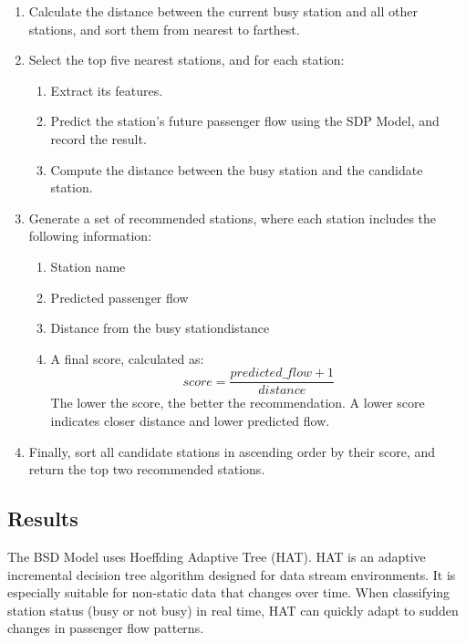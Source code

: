 \documentclass[11pt]{article} %
\begin{document}
\begin{enumerate}
	\item Calculate the distance between the current busy station and all other stations, and sort them from nearest to farthest.
	\item Select the top five nearest stations, and for each station:
	
		\begin{enumerate}
			\item Extract its features.
			\item Predict the station's future passenger flow using the SDP Model, and record the result.
			\item Compute the distance between the busy station and the candidate station.
		\end{enumerate}
		
	\item Generate a set of recommended stations, where each station includes the following information:
	
	\begin{enumerate}
		\item Station name
		\item Predicted passenger flow
		\item Distance from the busy stationdistance
		\item A final score, calculated as:
		\begin{equation}
			score = \frac{predicted\_flow + 1}{distance}
		\end{equation}
		The lower the score, the better the recommendation. A lower score indicates closer distance and lower predicted flow.
	\end{enumerate}
	
	\item Finally, sort all candidate stations in ascending order by their score, and return the top two recommended stations.
\end{enumerate}

\subsection{Results}
The BSD Model uses Hoeffding Adaptive Tree (HAT). HAT is an adaptive incremental decision tree algorithm designed for data stream environments. It is especially suitable for non-static data that changes over time. When classifying station status (busy or not busy) in real time, HAT can quickly adapt to sudden changes in passenger flow patterns.
\end{document}
